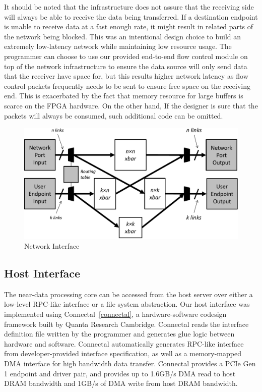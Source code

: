 It should be noted that the infrastructure does not assure that the receiving
side will always be able to receive the data being transferred. If a
destination endpoint is unable to receive data at a fast enough rate, it might
result in related parts of the network being blocked. This was an intentional
design choice to build an extremely low-latency network while maintaining low
resource usage. The programmer can choose to use our provided end-to-end flow
control module on top of the network infrastructure to ensure the data source
will only send data that the receiver have space for, but this results higher
network latency as flow control packets frequently needs to be sent to ensure
free space on the receiving end. This is exacerbated by the fact that memory
resource for large buffers is scarce on the FPGA hardware. On the other hand,
If the designer is sure that the packets will
always be consumed, such additional code can be omitted. 

\begin{figure}[h]
	\begin{center}
	\includegraphics[scale=0.4]{figures/network-routing-crop.pdf}
	\caption{Network Interface}
	\label{fig:networkinterface}
	\end{center}
\end{figure}


\subsection{Host Interface}

The near-data processing core can be accessed from the host server over either a
low-level RPC-like interface or a file system abstraction. Our host interface
was implemented using Connectal~\ref{connectal}, a hardware-software codesign
framework built by Quanta Research Cambridge. Connectal reads the interface
definition file written by the programmer and generates glue logic between
hardware and software. Connectal automatically generates RPC-like interface from
developer-provided interface specification, as well as a
memory-mapped DMA interface for high bandwidth data transfer. Connectal provides
a PCIe Gen 1 endpoint and driver pair, and provides up to 1.6GB/s DMA read to
host DRAM bandwidth and 1GB/s of DMA write from host DRAM bandwidth. 

